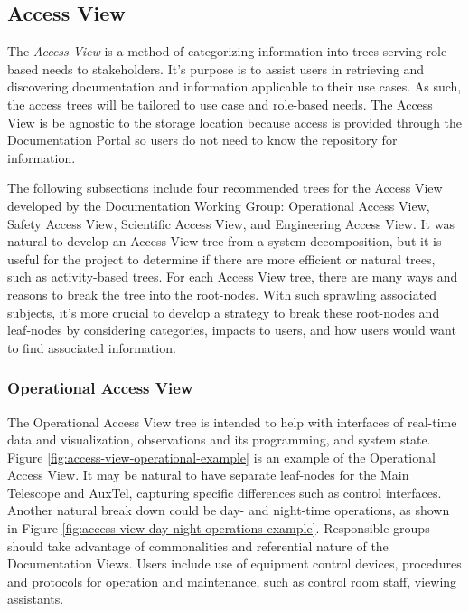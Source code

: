 \subsection{Access View}
\label{sec:access-view}

The \emph{Access View} is a method of categorizing information into trees serving role-based needs to stakeholders.
It's purpose is to assist users in retrieving and discovering documentation and information applicable to their use cases.
As such, the access trees will be tailored to use case and role-based needs.
The Access View is be agnostic to the storage location because access is provided through the Documentation Portal so users do not need to know the repository for information.

The following subsections include four recommended trees for the Access View developed by the Documentation Working Group: Operational Access View, Safety Access View, Scientific Access View, and Engineering Access View.
It was natural to develop an Access View tree from a system decomposition, but it is useful for the project to determine if there are more efficient or natural trees, such as activity-based trees.
For each Access View tree, there are many ways and reasons to break the tree into the root-nodes.
With such sprawling associated subjects, it's more crucial to develop a strategy to break these root-nodes and leaf-nodes by considering categories, impacts to users, and how users would want to find associated information.

\subsubsection{Operational Access View}

The Operational Access View tree is intended to help with interfaces of real-time data and visualization, observations and its programming, and system state.
Figure \ref{fig:access-view-operational-example} is an example of the Operational Access View.
It may be natural to have separate leaf-nodes for the Main Telescope and AuxTel, capturing specific differences such as control interfaces.
Another natural break down could be day- and night-time operations, as shown in Figure \ref{fig:access-view-day-night-operations-example}.
Responsible groups should take advantage of commonalities and referential nature of the Documentation Views.
Users include use of equipment control devices, procedures and protocols for operation and maintenance, such as control room staff, viewing assistants.

